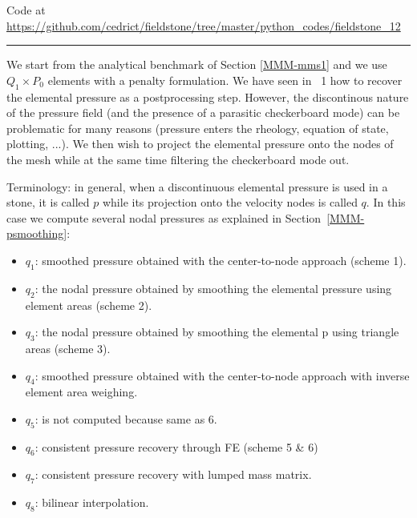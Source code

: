 

\begin{center}
Code at \url{https://github.com/cedrict/fieldstone/tree/master/python_codes/fieldstone_12}
\end{center}

\par\noindent\rule{\textwidth}{0.4pt}

We start from the analytical benchmark of Section \ref{MMM-mms1} and we use $Q_1 \times P_0$
elements with a penalty formulation. 
We have seen in \stone~1 how to recover the elemental pressure as a postprocessing step. 
However, the discontinous nature of the pressure field (and the presence of a
parasitic checkerboard mode) can be problematic for many reasons 
(pressure enters the rheology, equation of state, plotting, ...). 
We then wish to project the elemental pressure onto the nodes of the mesh while at the same 
time filtering the checkerboard mode out. 

Terminology: in general, when a discontinuous elemental pressure is used in a stone, 
it is called $p$ while its projection onto the velocity nodes is called $q$. 
In this case we compute several nodal pressures as explained in Section~\ref{MMM-psmoothing}:

\begin{itemize}
\item $q_1$: smoothed pressure obtained with the  center-to-node approach (scheme 1).

\item $q_2$: the nodal pressure obtained by smoothing the elemental pressure using element areas (scheme 2).

\item $q_3$: the nodal pressure obtained by smoothing the elemental p using triangle areas (scheme 3).

\item $q_4$: smoothed pressure obtained with the center-to-node approach with inverse element area weighing.

\item $q_5$: is not computed because same as 6.

\item $q_6$: consistent pressure recovery through FE (scheme 5 \& 6)

\item $q_7$: consistent pressure recovery with lumped mass matrix. 

\item $q_8$: bilinear interpolation. 

\end{itemize}

